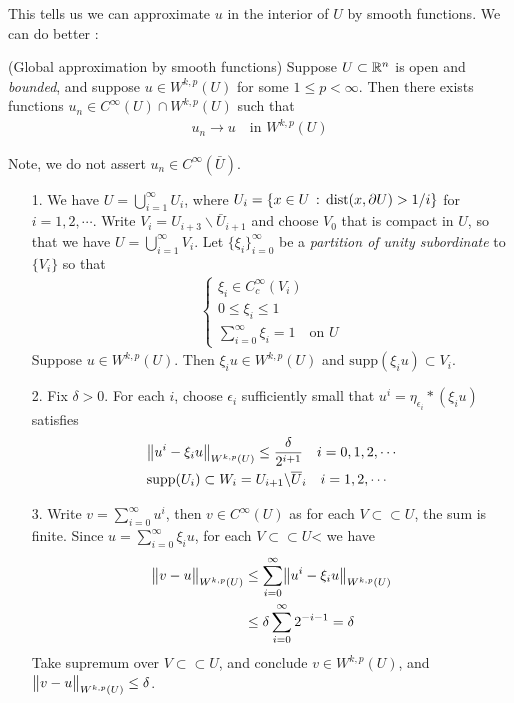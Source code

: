 \documentclass[10pt,a4paper]{report}
\newenvironment{proof}
{\begin{changemargin}{1cm}{0.5cm} 
	}%
	{\end{changemargin}
}
\begin{document}
This tells us we can approximate $u$ in the interior of $U$ by smooth functions. We can do better :
\s

\thm (Global approximation by smooth functions) Suppose $U\subset \mathbb{R}^n$ is open and \emph{bounded}, and suppose $u\in W^{k,p}(U)$ for some $1\leq p<\infty$. Then there exists functions $u_n \in C^{\infty}(U) \cap W^{k,p}(U)$ such that
\begin{align*}
u_n \rightarrow u \quad \text{in } W^{k,p}(U)
\end{align*}

Note, we do not assert $u_n \in C^{\infty}(\bar{U})$.
\begin{proof}
\pf \begin{itemize}
\item[1.] We have $U = \bigcup_{i=1}^{\infty} U_i$, where $U_i = \{x\in U \, : \, \text{dist}(x,\partial U) > 1/i \}$ for $i=1,2,\cdots$. Write $V_i = U_{i+3} \backslash \bar{U}_{i+1}$ and choose $V_0$ that is compact in $U$, so that we have $U = \bigcup_{i=1}^{\infty} V_i$. Let $\{\xi_i\}_{i=0}^{\infty}$ be a \emph{partition of unity subordinate} to $\{V_i \}$ so that
\begin{align*}
\begin{cases}
\xi_i \in C_c^{\infty}(V_i) \\
0\leq \xi_i \leq 1 \\
\sum_{i=0}^{\infty} \xi_i = 1 \quad \text{on } U
\end{cases}
\end{align*}
Suppose $u\in W^{k,p}(U)$. Then $\xi_i u \in W^{k,p}(U)$ and $\text{supp}(\xi_i u) \subset V_i$.
\item[2.] Fix $\delta >0$. For each $i$, choose $\epsilon_i$ sufficiently small that $u^i = \eta_{\epsilon_i} * (\xi_i u)$ satisfies
\begin{align*}
&\bigl\lVert u^i - \xi_i u\bigr\rVert_{W^{k,p}(U)} \leq \frac{\delta}{2^{i+1}} \quad i=0,1,2,\cdots \\
& \text{supp}(U_i) \subset W_i = U_{i+1} \backslash \overline{U}_i \quad i=1,2,\cdots
\end{align*}
\item[3.] Write $v = \sum_{i=0}^{\infty} u^i$, then $v \in C^{\infty}(U)$ as for each $V \subset\subset U$, the sum is finite. Since $u = \sum_{i=0}^{\infty} \xi_i u$, for each $V\subset\subset U$< we have
\begin{align*}
\bigl\lVert v-u\bigr\rVert_{W^{k,p}(U)} &\leq \sum_{i=0}^{\infty} \bigl\lVert u^i- \xi_i u\bigr\rVert_{W^{k,p}(U)} \\
& \leq \delta \sum_{i=0}^{\infty} 2^{-i-1} = \delta
\end{align*}
Take supremum over $V\subset\subset U$, and conclude $v \in W^{k,p}(U)$, and $\bigl\lVert v-u\bigr\rVert_{W^{k,p}(U)} \leq \delta$.
\end{itemize}

\eop
\end{proof}
\s
\end{document}
